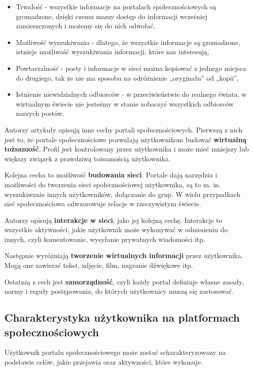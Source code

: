 \documentclass[polish,12pt]{aghthesis}
\begin{document}
\begin{itemize}
    \item Trwałość - wszystkie informacje na portalach społecznościowych są gromadzone, dzięki czemu mamy dostęp do informacji wcześniej zamieszczonych i możemy się do nich odwołać,
    \item Możliwość wyszukiwania - dlatego, że wszystkie informacje są gromadzone, istnieje możliwość wyszukiwania informacji, które nas interesują,
    \item Powtarzalność - posty i informacje w sieci można kopiować z jednego miejsca do drugiego, tak że nie ma sposobu na odróżnienie „oryginału” od „kopii”,
    \item Istnienie niewidzialnych odbiorców - w przeciwieństwie do realnego świata, w wirtualnym świecie nie jesteśmy w stanie zobaczyć wszystkich odbiorców naszych postów.
\end{itemize}

Autorzy artykuły \cite{snsCharacteristics} opisują inne cechy portali społecznościowych. Pierwszą z nich jest to, że portale społecznościowe pozwalają użytkownikom budować \textbf{wirtualną tożsamość}. Profil jest kontrolowany przez użytkownika i może mieć mniejszy lub większy związek z prawdziwą tożsamością użytkownika.

Kolejna cecha to możliwość \textbf{budowania sieci}. Portale dają narzędzia i możliwości do tworzenia sieci społecznościowej użytkownika, są to m. in. wyszukiwanie innych użytkowników, dołączanie do grup. W wielu przypadkach sieć społecznościowa odwzorowuje relacje w rzeczywistym świecie. 

Autorzy opisują \textbf{interakcje w sieci}, jako jej kolejną cechę. Interakcje to wszystkie aktywności, jakie użytkownik może wykonywać w odniesieniu do innych, czyli komentowanie, wysyłanie prywatnych wiadomości itp.

Następnie wyróżniają \textbf{tworzenie wirtualnych informacji} przez użytkownika. Mogą one zawierać tekst, zdjęcie, film, nagranie dźwiękowe itp.

Ostatnią z cech jest \textbf{samorządność}, czyli każdy portal definiuje własne zasady, normy i reguły postępowania, do których użytkownicy muszą się zastosować.

\subsection{Charakterystyka użytkownika na platformach społecznościowych}
Użytkownik portalu społecznościowego może zostać scharakteryzowany na podstawie celów, jakie przejawia oraz aktywności, które wykonuje.
\end{document}
